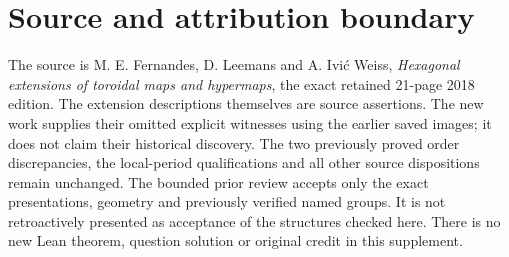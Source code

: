 \documentclass[11pt,a4paper]{article}
\begin{document}
\section{Source and attribution boundary}
The source is M. E. Fernandes, D. Leemans and A. Ivi\'c Weiss, \emph{Hexagonal extensions of toroidal maps and hypermaps}, the exact retained 21-page 2018 edition. The extension descriptions themselves are source assertions. The new
work supplies their omitted explicit witnesses using the earlier saved
images; it does not claim their historical discovery. The two previously
proved order discrepancies, the local-period qualifications and all other
source dispositions remain unchanged. The bounded prior review accepts
only the exact presentations, geometry and previously verified named
groups. It is not retroactively presented as acceptance of the structures
checked here. There is no new Lean theorem, question solution or original
credit in this supplement.
\end{document}
